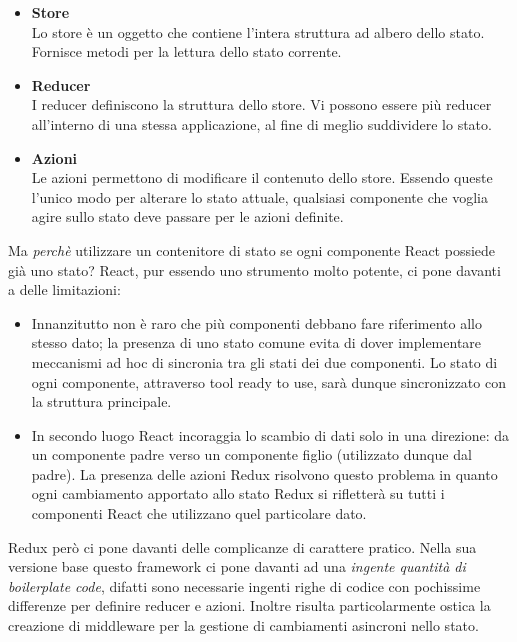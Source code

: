 \begin{itemize}
  \item \textbf{Store}\\
  Lo store \cite{store_redux} è un oggetto che contiene l'intera struttura ad albero dello stato.\newline
  Fornisce metodi per la lettura dello stato corrente.
  \item \textbf{Reducer}\\
  I reducer \cite{reducer_redux} definiscono la struttura dello store.\newline
  Vi possono essere più reducer all'interno di una stessa applicazione, al fine di meglio suddividere lo stato.
  \item \textbf{Azioni}\\
  Le azioni \cite{azioni_redux} permettono di modificare il contenuto dello store.\newline
  Essendo queste l'unico modo per alterare lo stato attuale, qualsiasi componente che voglia agire sullo stato deve passare per le azioni definite.
\end{itemize}
Ma \emph{perchè} utilizzare un contenitore di stato se ogni componente React possiede già uno stato?
React, pur essendo uno strumento molto potente, ci pone davanti a delle limitazioni:
\begin{itemize}
  \item
  Innanzitutto non è raro che più componenti debbano fare riferimento allo stesso dato; la presenza di uno stato comune evita di dover implementare meccanismi ad hoc di sincronia tra gli stati dei due componenti.\newline
  Lo stato di ogni componente, attraverso tool ready to use, sarà dunque sincronizzato con la struttura principale.
  \item
  In secondo luogo React incoraggia lo scambio di dati solo in una direzione: da un componente padre verso un componente figlio (utilizzato dunque dal padre).\newline
  La presenza delle azioni Redux risolvono questo problema in quanto ogni cambiamento apportato allo stato Redux si rifletterà su tutti i componenti React che utilizzano quel particolare dato.
\end{itemize}
Redux però ci pone davanti delle complicanze di carattere pratico.\newline
Nella sua versione base questo framework ci pone davanti ad una \emph{ingente quantità di boilerplate code}, difatti sono necessarie ingenti righe di codice con pochissime differenze per definire reducer e azioni.\newline
Inoltre risulta particolarmente ostica la creazione di middleware per la gestione di cambiamenti asincroni nello stato.\newline

